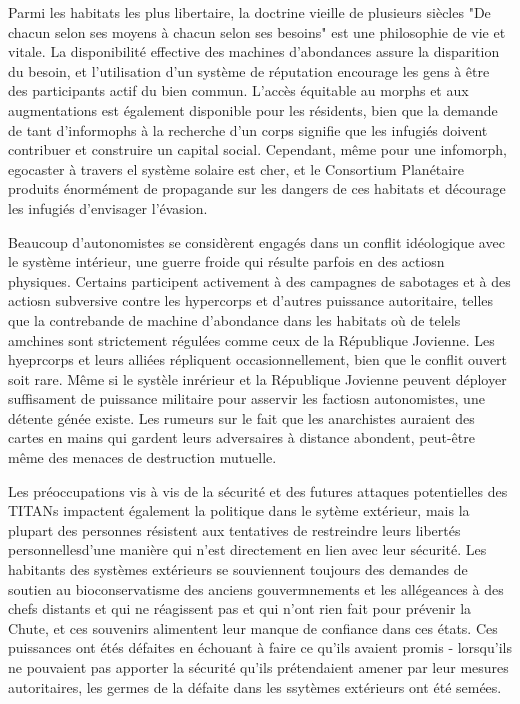                Parmi les habitats les plus libertaire, la doctrine vieille de plusieurs siècles "De chacun selon ses moyens à chacun selon ses besoins" est une philosophie de vie et vitale. La disponibilité effective des machines d'abondances assure la disparition du besoin, et l'utilisation d'un système de réputation encourage les gens à être des participants actif du bien commun. L'accès équitable au morphs et aux augmentations est également disponible pour les résidents, bien que la demande de tant d'informophs à la recherche d'un corps signifie que les infugiés doivent contribuer et construire un capital social. Cependant, même pour une infomorph, egocaster à travers el système solaire est cher, et le Consortium Planétaire produits énormément de propagande sur les dangers de ces habitats et décourage les infugiés d'envisager l'évasion. 

               Beaucoup d'autonomistes se considèrent engagés dans un conflit idéologique avec le système intérieur, une guerre froide qui résulte parfois en des actiosn physiques. Certains participent activement à des campagnes de sabotages et à des actiosn subversive contre les hypercorps et d'autres puissance autoritaire, telles que la contrebande de machine d'abondance dans les habitats où de telels amchines sont strictement régulées comme ceux de la République Jovienne. Les hyeprcorps et leurs alliées répliquent occasionnellement, bien que le conflit ouvert soit rare. Même si le systèle inrérieur et la République Jovienne peuvent déployer suffisament de puissance militaire pour asservir les factiosn autonomistes, une détente génée existe. Les rumeurs sur le fait que les anarchistes auraient des cartes en mains qui gardent leurs adversaires à distance abondent, peut-être même des menaces de destruction mutuelle. 

               Les préoccupations vis à vis de la sécurité et des futures attaques potentielles des TITANs impactent également la politique dans le sytème extérieur, mais la plupart des personnes résistent aux tentatives de restreindre leurs libertés personnellesd'une manière qui n'est directement en lien avec leur sécurité. Les habitants des systèmes extérieurs se souviennent toujours des demandes de soutien au bioconservatisme des anciens gouvermnements et les allégeances à des chefs distants et qui ne réagissent pas et qui n'ont rien fait pour prévenir la Chute, et ces souvenirs alimentent leur manque de confiance dans ces états. Ces puissances ont étés défaites en échouant à faire ce qu'ils avaient promis - lorsqu'ils ne pouvaient pas apporter la sécurité qu'ils prétendaient amener par leur mesures autoritaires, les germes de la défaite dans les ssytèmes extérieurs ont été semées. 

